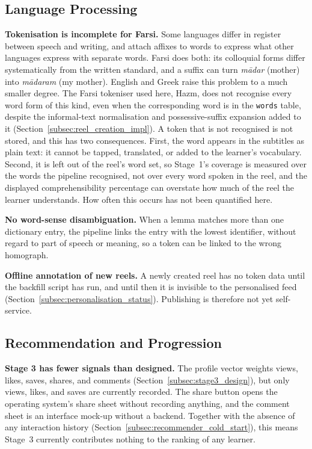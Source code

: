     \subsection{Language Processing}
    \begin{sloppypar}
    \textbf{Tokenisation is incomplete for Farsi.} Some languages differ in register between speech and writing, and attach affixes to words to express what other languages express with separate words. Farsi does both: its colloquial forms differ systematically from the written standard, and a suffix can turn \textit{m\={a}dar} (mother) into \textit{m\={a}daram} (my mother). English and Greek raise this problem to a much smaller degree. The Farsi tokeniser used here, Hazm, does not recognise every word form of this kind, even when the corresponding word is in the \texttt{words} table, despite the informal-text normalisation and possessive-suffix expansion added to it (Section~\ref{subsec:reel_creation_impl}). A token that is not recognised is not stored, and this has two consequences. First, the word appears in the subtitles as plain text: it cannot be tapped, translated, or added to the learner's vocabulary. Second, it is left out of the reel's word set, so Stage~1's coverage is measured over the words the pipeline recognised, not over every word spoken in the reel, and the displayed comprehensibility percentage can overstate how much of the reel the learner understands. How often this occurs has not been quantified here.
    \end{sloppypar}

    \textbf{No word-sense disambiguation.} When a lemma matches more than one dictionary entry, the pipeline links the entry with the lowest identifier, without regard to part of speech or meaning, so a token can be linked to the wrong homograph.

    \textbf{Offline annotation of new reels.} A newly created reel has no token data until the backfill script has run, and until then it is invisible to the personalised feed (Section~\ref{subsec:personalisation_status}). Publishing is therefore not yet self-service.

    \subsection{Recommendation and Progression}
    \textbf{Stage 3 has fewer signals than designed.} The profile vector weights views, likes, saves, shares, and comments (Section~\ref{subsec:stage3_design}), but only views, likes, and saves are currently recorded. The share button opens the operating system's share sheet without recording anything, and the comment sheet is an interface mock-up without a backend. Together with the absence of any interaction history (Section~\ref{subsec:recommender_cold_start}), this means Stage~3 currently contributes nothing to the ranking of any learner.

